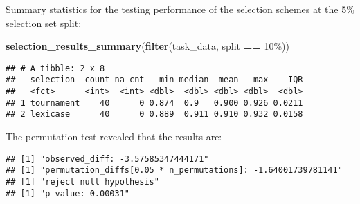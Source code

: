 \documentclass[
]{book}
\newenvironment{Shaded}{\begin{snugshade}}{\end{snugshade}}
\newcommand{\AttributeTok}[1]{\textcolor[rgb]{0.13,0.29,0.53}{#1}}
\newcommand{\DecValTok}[1]{\textcolor[rgb]{0.00,0.00,0.81}{#1}}
\newcommand{\FunctionTok}[1]{\textcolor[rgb]{0.13,0.29,0.53}{\textbf{#1}}}
\newcommand{\NormalTok}[1]{#1}
\newcommand{\OtherTok}[1]{\textcolor[rgb]{0.56,0.35,0.01}{#1}}
\newcommand{\SpecialCharTok}[1]{\textcolor[rgb]{0.81,0.36,0.00}{\textbf{#1}}}
\newcommand{\StringTok}[1]{\textcolor[rgb]{0.31,0.60,0.02}{#1}}
\begin{document}
Summary statistics for the testing performance of the selection schemes at the 5\% selection set split:

\begin{Shaded}
\begin{Highlighting}[]
\FunctionTok{selection\_results\_summary}\NormalTok{(}\FunctionTok{filter}\NormalTok{(task\_data, split }\SpecialCharTok{==} \StringTok{\textquotesingle{}10\%\textquotesingle{}}\NormalTok{))}
\end{Highlighting}
\end{Shaded}

\begin{verbatim}
## # A tibble: 2 x 8
##   selection  count na_cnt   min median  mean   max    IQR
##   <fct>      <int>  <int> <dbl>  <dbl> <dbl> <dbl>  <dbl>
## 1 tournament    40      0 0.874  0.9   0.900 0.926 0.0211
## 2 lexicase      40      0 0.889  0.911 0.910 0.932 0.0158
\end{verbatim}

The permutation test revealed that the results are:

\begin{Shaded}
\end{Shaded}

\begin{verbatim}
## [1] "observed_diff: -3.57585347444171"
## [1] "permutation_diffs[0.05 * n_permutations]: -1.64001739781141"
## [1] "reject null hypothesis"
## [1] "p-value: 0.00031"
\end{verbatim}
\end{document}
